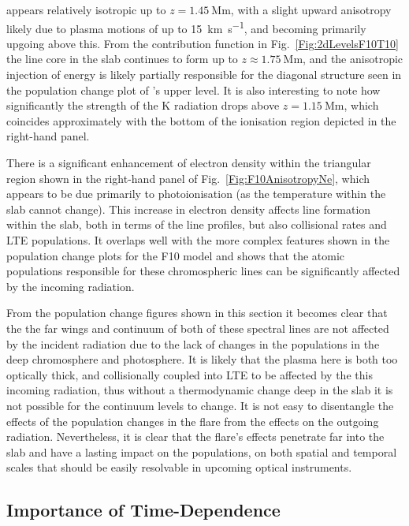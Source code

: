 \Ha{} appears relatively isotropic up to $z=\SI{1.45}{\mega\metre}$, with a slight upward anisotropy likely due to plasma motions of up to \SI{15}{\kilo\metre\per\second}, and becoming primarily upgoing above this.
From the contribution function in Fig.~\ref{Fig:2dLevelsF10T10} the \Ha{} line core in the slab continues to form up to $z\approx\SI{1.75}{\mega\metre}$, and the anisotropic injection of energy is likely partially responsible for the diagonal structure seen in the population change plot of \Ha{}'s upper level.
It is also interesting to note how significantly the strength of the \Caii{} K radiation drops above $z=\SI{1.15}{\mega\metre}$, which coincides approximately with the bottom of the ionisation region depicted in the right-hand panel.

There is a significant enhancement of electron density within the triangular region shown in the right-hand panel of Fig.~\ref{Fig:F10AnisotropyNe}, which appears to be due primarily to photoionisation (as the temperature within the slab cannot change).
This increase in electron density affects line formation within the slab, both in terms of the line profiles, but also collisional rates and LTE populations.
It overlaps well with the more complex features shown in the population change plots for the F10 model and shows that the atomic populations responsible for these chromospheric lines can be significantly affected by the incoming radiation.

From the population change figures shown in this section it becomes clear that the the far wings and continuum of both of these spectral lines are not affected by the incident radiation due to the lack of changes in the populations in the deep chromosphere and photosphere.
It is likely that the plasma here is both too optically thick, and collisionally coupled into LTE to be affected by the this incoming radiation, thus without a thermodynamic change deep in the slab it is not possible for the continuum levels to change.
It is not easy to disentangle the effects of the population changes in the flare from the effects on the outgoing radiation.
Nevertheless, it is clear that the flare's effects penetrate far into the slab and have a lasting impact on the populations, on both spatial and temporal scales that should be easily resolvable in upcoming optical instruments.

\subsection{Importance of Time-Dependence}\label{Sec:2dTimeDepSE}

